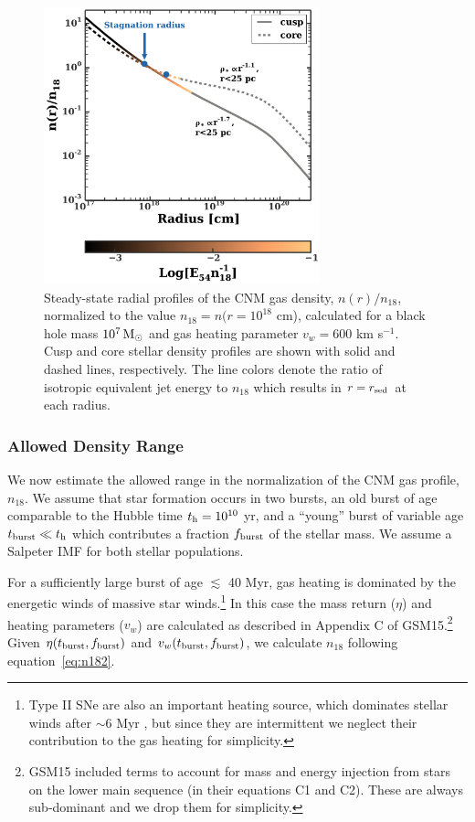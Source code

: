 \documentclass[usenatbib,fleqn]{mnras}
\newcommand{\Msun}{{\rm M_\odot}}
\begin{document}
\begin{figure}
\includegraphics[width=8cm]{sedov_radius.pdf}
\caption{\label{fig:profiles} Steady-state radial profiles of the CNM
  gas density, $n(r)/n_{18}$, normalized to the value $n_{18} = n(r =
  10^{18}$ cm), calculated for a black hole mass $10^{7} \,\Msun$ and
  gas heating parameter $v_w=600$ km s$^{-1}$.  Cusp and core stellar
  density profiles are shown with solid and dashed lines,
  respectively.  The line colors denote the ratio of isotropic
  equivalent jet energy to $n_{18}$ which results in $r = r_{\rm sed}$
  at each radius.}
\end{figure}

\subsubsection{Allowed Density Range}
\label{sec:densAllowed}
We now estimate the allowed range in the normalization of the CNM gas
profile, $n_{18}$.  We assume that star formation occurs in two
bursts, an old burst of age comparable to the Hubble time $t_{\rm h} =
10^{10}$ yr, and a ``young'' burst of variable age $t_{\rm burst} \ll
t_{\rm h}$ which contributes a fraction $f_{\rm burst}$ of the stellar
mass. We assume a Salpeter IMF for both stellar populations.

For a sufficiently large burst of age $\lesssim$ 40 Myr, gas heating
is dominated by the energetic winds of massive star
winds.\footnote{Type II SNe are also an important heating source,
  which dominates stellar winds after $\sim$6 Myr \citep{Voss+2009},
  but since they are intermittent we neglect their contribution to the
  gas heating for simplicity.}  In this case the mass return ($\eta$)
and heating parameters ($v_w$) are calculated as described in Appendix
C of GSM15.\footnote{GSM15 included terms to account for mass and
  energy injection from stars on the lower main sequence (in their
  equations C1 and C2). These are always sub-dominant and we drop them
  for simplicity.}  Given $\eta(t_{\rm burst},f_{\rm burst})$ and
$v_w(t_{\rm burst},f_{\rm burst})$, we calculate $n_{18}$ following
equation~\eqref{eq:n182}.
\end{document}
